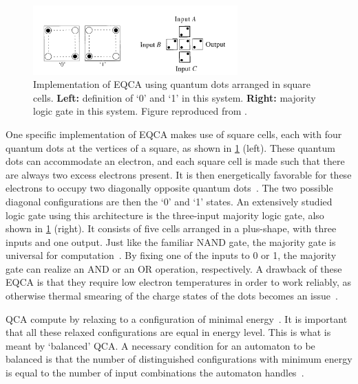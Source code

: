 \documentclass[11pt,a4paper,english,twoside]{article}
\begin{document}
\begin{figure}[b!] %
    \centering
    \includegraphics[width=0.7\textwidth]{Figures/Introduction/QCA_DigitalLogicGate - Figure 1ab.png}
    \caption{Implementation of EQCA using quantum dots arranged in square cells. \textbf{Left:} definition of `0' and `1' in this system. \textbf{Right:} majority logic gate in this system. Figure reproduced from \cite{QCA_DigitalLogicGate}.}
    \label{fig:Intro_EQCA}
\end{figure}
One specific implementation of EQCA makes use of square cells, each with four quantum dots at the vertices of a square, as shown in \cref{fig:Intro_EQCA} (left). These quantum dots can accommodate an electron, and each square cell is made such that there are always two excess electrons present. It is then energetically favorable for these electrons to occupy two diagonally opposite quantum dots~\cite{QCA_DigitalLogicGate}. The two possible diagonal configurations are then the `0' and `1' states. An extensively studied logic gate using this architecture is the three-input majority logic gate, also shown in \cref{fig:Intro_EQCA} (right). It consists of five cells arranged in a plus-shape, with three inputs and one output. Just like the familiar NAND gate, the majority gate is universal for computation~\cite{NML_Carlton}. By fixing one of the inputs to 0 or 1, the majority gate can realize an AND or an OR operation, respectively. A drawback of these EQCA is that they require low electron temperatures in order to work reliably, as otherwise thermal smearing of the charge states of the dots becomes an issue~\cite{QCA_DigitalLogicGate}. \par
QCA compute by relaxing to a configuration of minimal energy~\cite{QCA_Algorithms}. It is important that all these relaxed configurations are equal in energy level. This is what is meant by `balanced' QCA. A necessary condition for an automaton to be balanced is that the number of distinguished configurations with minimum energy is equal to the number of input combinations the automaton handles~\cite{QCA_Algorithms}.
\end{document}

